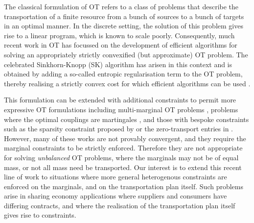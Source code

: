 \documentclass[twocolumn]{article}
\begin{document}
The classical formulation of OT refers to a class of problems that describe the transportation of a finite resource from a bunch of sources  to a bunch of targets in an optimal manner. In the discrete setting, the solution of this problem gives rise to a linear program, which is known to scale poorly. Consequently, much recent work in OT has focussed on the development of efficient algorithms for solving an appropriately strictly {convexified} (but approximate) OT problem. The celebrated Sinkhorn-Knopp (SK) algorithm has arisen in this context and is obtained by adding a so-called entropic regularisation term to the OT problem, thereby realising a strictly convex cost for which efficient algorithms can be used \cite{Cut1,Bregman1967}.

This formulation can be extended with additional constraints to permit more expressive OT formulations including 
multi-marginal OT problems \cite{gangbo1998optimal,pass2015multi},
problems where the optimal couplings are martingales \cite{galichon2014stochastic,guo2019computational}, and those with bespoke constraints such as the sparsity constraint proposed by \cite{liu2022sparsity} or the zero-transport entries in \cite{martin}. However, many of these works are not provably convergent, and they require the marginal constraints to be strictly enforced. Therefore they are not appropriate for solving \textit{unbalanced} \cite{benamou2003numerical,chizat2018unbalanced} OT problems, where the marginals may not be of equal mass, or not all mass need be transported. 
Our interest is to extend this recent line of work to situations where more general heterogenous constraints are enforced on the marginals, and on the transportation plan itself. Such problems arise in sharing economy applications where suppliers and consumers have differing contracts, and where the realisation of the transportation plan itself gives rise to constraints.
\end{document}
